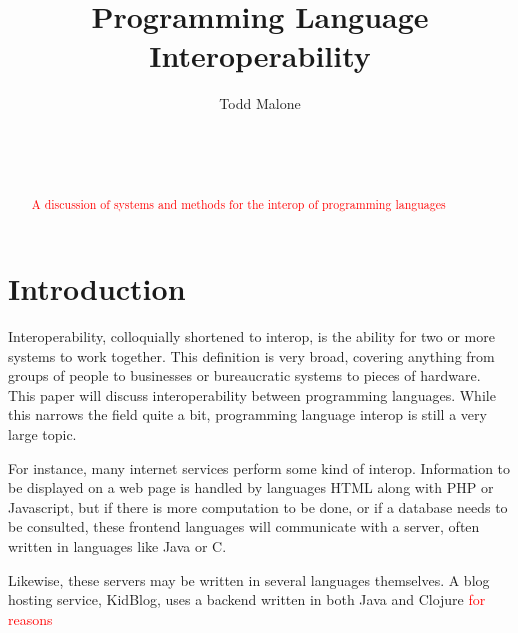 \documentclass{sig-alternate}
\newcommand{\mycomment}[1]{\textcolor{red}{#1}}
\begin{document}

\title{Programming Language Interoperability}


\author{
\alignauthor
Todd Malone\\
	\\
	\\
	\\
}

\maketitle
\begin{abstract}
\mycomment{A discussion of systems and methods for the interop of programming languages}
\end{abstract}


\section{Introduction}
Interoperability, colloquially shortened to interop, is the ability for two or more systems to work together. This definition is very broad, covering anything from groups of people to businesses or bureaucratic systems to pieces of hardware. This paper will discuss interoperability between programming languages. While this narrows the field quite a bit, programming language interop is still a very large topic.

For instance, many internet services perform some kind of interop. Information to be displayed on a web page is handled by languages HTML along with PHP or Javascript, but if there is more computation to be done, or if a database needs to be consulted, these frontend languages will communicate with a server, often written in languages like Java or C.

Likewise, these servers may be written in several languages themselves. A blog hosting service, KidBlog, uses a backend written in both Java and Clojure \mycomment{for reasons}
\end{document}
